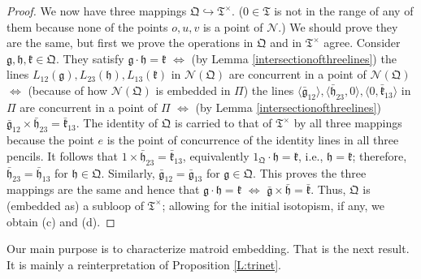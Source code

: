 \documentclass[reqno,12pt]{amsart}
\theoremstyle{remark}
\numberwithin{equation}{section}
\numberwithin{figure}{section}
\newcommand\embeds{\hookrightarrow}
\newcommand \cN{\mathcal{N}}
\newcommand \fQ{\mathfrak Q}
\newcommand \fT{\mathfrak T}
\newcommand\Qg{\mathfrak g}
\newcommand\Qh{\mathfrak h}
\newcommand\Qk{\mathfrak k}
\newcommand\Tg{\bar{\mathfrak g}}
\newcommand\Th{\bar{\mathfrak h}}
\newcommand\Tk{\bar{\mathfrak k}}
\newcommand\PP{\Pi}	%
\begin{document}
\begin{proof}
We now have three mappings $\fQ \embeds \fT^\times$.  ($0\in\fT$ is not in the range of any of them because none of the points $o,u,v$ is a point of $\cN$.)  We should prove they are the same, but first we prove the operations in $\fQ$ and in $\fT^\times$ agree.  
Consider $\Qg,\Qh,\Qk\in\fQ$.  They satisfy $\Qg\cdot\Qh=\Qk$ 
$\iff$ (by Lemma \ref{intersectionofthreelines}) the lines $L_{12}(\Qg), L_{23}(\Qh), L_{13}(\Qk)$ in $\cN(\fQ)$ are concurrent in a point of $\cN(\fQ)$ 
$\iff$ (because of how $\cN(\fQ)$ is embedded in $\PP$) the lines $\langle \Tg_{12} \rangle, \langle \Th_{23}, 0 \rangle, \langle 0, \Tk_{13} \rangle$ in $\PP$ are concurrent in a point of $\PP$ 
$\iff$ (by Lemma \ref{intersectionofthreelines}) $\Tg_{12}\times\Th_{23} = \Tk_{13}$.  
The identity of $\fQ$ is carried to that of $\fT^\times$ by all three mappings because the point $e$ is the point of concurrence of the identity lines in all three pencils.  It follows that $1 \times \Th_{23} = \Tk_{13}$, equivalently $1_\fQ \cdot \Qh = \Qk$, i.e., $\Qh=\Qk$; therefore, $\Th_{23}=\Th_{13}$ for $\Qh \in \fQ$.  Similarly, $\Tg_{12}=\Tg_{13}$ for $\Qg \in\fQ$.  This proves the three mappings are the same and hence that $\Qg\cdot\Qh=\Qk$ $\iff$ $\Tg\times\Th = \Tk$.  
Thus, $\fQ$ is (embedded as) a subloop of $\fT^\times$; allowing for the initial isotopism, if any, we obtain (c) and (d).
\end{proof}

Our main purpose is to characterize matroid embedding.  That is the next result.  It is mainly a reinterpretation of Proposition \ref{L:trinet}.
\end{document}

